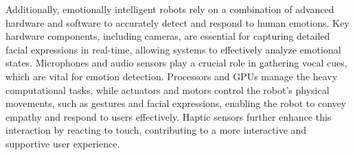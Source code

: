 Additionally, emotionally intelligent robots rely on a combination of advanced hardware and software to accurately detect and respond to human emotions. Key hardware components, including cameras, are essential for capturing detailed facial expressions in real-time, allowing systems to effectively analyze emotional states. Microphones and audio sensors play a crucial role in gathering vocal cues, which are vital for emotion detection. Processors and GPUs manage the heavy computational tasks, while actuators and motors control the robot’s physical movements, such as gestures and facial expressions, enabling the robot to convey empathy and respond to users effectively. Haptic sensors further enhance this interaction by reacting to touch, contributing to a more interactive and supportive user experience.
